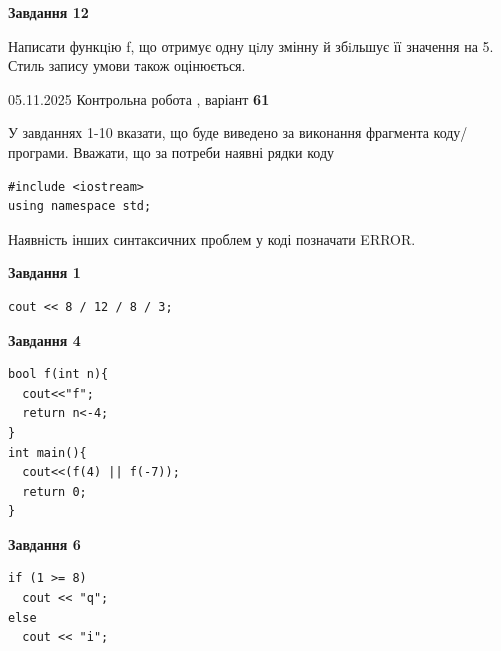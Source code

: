 \documentclass[12pt, ukrainian]{article}
\begin{document}
{\begin {large}
\begin{minipage}[t]{11.0cm}
\begin{center}
\textbf{Завдання 12}
\end{center}

Написати функцiю f, що отримує одну цiлу змінну й збiльшує її значення на 5. Стиль запису умови також оцінюється.\par

\end{minipage}

\end {large}}
\newpage

{\Large{05.11.2025 Контрольна робота , варіант  \No \textbf { 61 }\par}}
{
\begin {large}
У завданнях 1-10 вказати, що буде виведено за виконання фрагмента коду/про\-гра\-ми.
Вважати, що за потреби наявні рядки коду
\begin{verbatim}
#include <iostream>
using namespace std;
\end{verbatim}
Наявність інших синтаксичних проблем у коді позначати ERROR.

\begin{minipage}[t]{7.0cm}

\begin{center}
\textbf{Завдання 1}
\end{center}
\vspace{-8mm}

\begin{verbatim}
cout << 8 / 12 / 8 / 3;
\end{verbatim}



\begin{center}
\textbf{Завдання 4}
\end{center}
\vspace{-8mm}

\begin{verbatim}
bool f(int n){
  cout<<"f";
  return n<-4;
}
int main(){
  cout<<(f(4) || f(-7));
  return 0;
}
\end{verbatim}



\begin{center}
\textbf{Завдання 6}
\end{center}
\vspace{-8mm}

\begin{verbatim}
if (1 >= 8)
  cout << "q";
else
  cout << "i";
\end{verbatim}




\end{minipage}
\end{large}}
\end{document}
